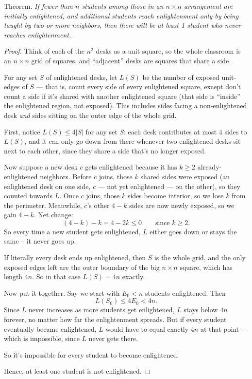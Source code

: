\documentclass[11pt]{article}
\begin{document}
Theorem. \textit{If fewer than $n$ students among those in an $n \times n$ arrangement are initially enlightened, and additional students reach enlightenment only by being taught by two or more neighbors, then there will be at least 1 student who never reaches enlightenment.}
\begin{proof}
Think of each of the $n^2$ desks as a unit square, so the whole classroom is an $n \times n$ grid of squares, and ``adjacent'' desks are squares that share a side.
 
For any set $S$ of enlightened desks, let $L(S)$ be the number of exposed unit-edges of $S$ --- that is, count every side of every enlightened square, except don't count a side if it's shared with another enlightened square (that side is ``inside'' the enlightened region, not exposed). This includes sides facing a non-enlightened desk \emph{and} sides sitting on the outer edge of the whole grid.
 
First, notice $L(S) \le 4|S|$ for any set $S$: each desk contributes at most $4$ sides to $L(S)$, and it can only go down from there whenever two enlightened desks sit next to each other, since they share a side that's no longer exposed.
 
Now suppose a new desk $c$ gets enlightened because it has $k \ge 2$ already-enlightened neighbors. Before $c$ joins, those $k$ shared sides were exposed (an enlightened desk on one side, $c$ --- not yet enlightened --- on the other), so they counted towards $L$. Once $c$ joins, those $k$ sides become interior, so we lose $k$ from the perimeter. Meanwhile, $c$'s other $4-k$ sides are now newly exposed, so we gain $4-k$. Net change:
\[
(4-k) - k = 4 - 2k \le 0 \qquad \text{since } k \ge 2.
\]
So every time a new student gets enlightened, $L$ either goes down or stays the same – it never goes up.
 
If literally every desk ends up enlightened, then $S$ is the whole grid, and the only exposed edges left are the outer boundary of the big $n \times n$ square, which has length $4n$. So in that case $L(S) = 4n$ exactly.
 
Now put it together. Say we start with $E_0 < n$ students enlightened. Then
\[
L(S_0) \le 4E_0 < 4n.
\]
Since $L$ never increases as more students get enlightened, $L$ stays below $4n$ forever, no matter how far the enlightenment spreads. But if every student eventually became enlightened, $L$ would have to equal exactly $4n$ at that point --- which is impossible, since $L$ never gets there.
 
So it's impossible for every student to become enlightened.

Hence, at least one student is not enlightened.
\end{proof}
\end{document}
